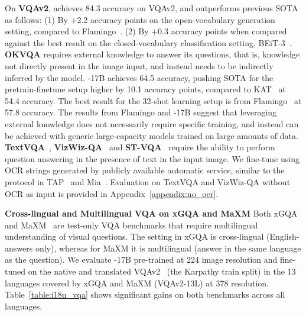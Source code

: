 \documentclass{article}
\begin{document}
On \textbf{VQAv2}, \NAME achieves 84.3 accuracy on VQAv2, and outperforms previous SOTA as follows:
(1) By +2.2 accuracy points on the open-vocabulary generation setting, compared to Flamingo~\citep{flamingo}.
(2) By +0.3 accuracy points when compared against the best result on the closed-vocabulary classification setting, BEiT-3~\citep{beit3}. \textbf{OKVQA} requires external knowledge to answer its questions, that is, knowledge not directly present in the image input, and instead needs to be indirectly inferred by the model.
\NAME-17B achieves 64.5 accuracy, pushing SOTA for the pretrain-finetune setup higher by 10.1 accuracy points, compared to KAT~\citep{kat-okvqa-2022} at 54.4 accuracy.
The best result for the 32-shot learning setup is from Flamingo~\citep{flamingo} at 57.8 accuracy.
The results from Flamingo and \NAME-17B suggest that leveraging external knowledge does not necessarily require specific training, and instead can be achieved with generic large-capacity models trained on large amounts of data.
\textbf{TextVQA}~\citep{textvqa}, \textbf{VizWiz-QA}~\citep{gurari2018vizwiz} and \textbf{ST-VQA}~\citep{ST-VQA} require the ability to perform question answering in the presence of text in the input image.
We fine-tune using OCR strings generated by publicly available automatic service, similar to the protocol in TAP~\citep{tap} and Mia~\citep{mia_textvqa}.
Evaluation on TextVQA and VizWiz-QA without OCR as input is provided in Appendix~\ref{appendix:no_ocr}.

\textbf{Cross-lingual and Multilingual VQA on xGQA and MaXM} 
Both xGQA~\citep{xgqa} and MaXM~\citep{maxm} are test-only VQA benchmarks that require multilingual understanding of visual questions.
The setting in xGQA is cross-lingual (English-answers only), whereas for MaXM it is multilingual (answer in the same language as the question).
We evaluate \NAME-17B pre-trained at 224 image resolution and fine-tuned on the native and translated VQAv2~\citep{vqav2} (the Karpathy train split) in the 13 languages covered by xGQA and MaXM (VQAv2-13L) at 378 resolution. 
Table~\ref{table:i18n_vqa} shows significant gains on both benchmarks across all languages.
\end{document}
